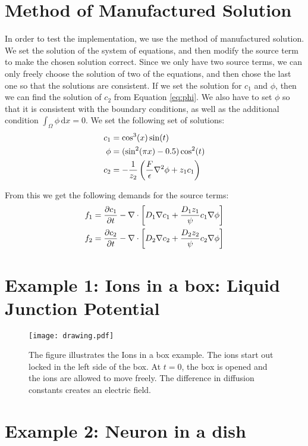 \documentclass[12pt]{article}
\begin{document}
\section{Method of Manufactured Solution}
In order to test the implementation, we use the method of manufactured solution. We set the solution of the system of equations, and then modify the source term to make the chosen solution correct. Since we only have two source terms, we can only freely choose the solution of two of the equations, and then chose the last one so that the solutions are consistent. If we set the solution for $c_1$ and $\phi$, then we can find the solution of $c_2$ from Equation \eqref{eq:phi}. We also have to set $\phi$ so that it is consistent with the boundary conditions, as well as the additional condition $\int_\Omega \phi\, \text{d}x = 0$. We set the following set of solutions:
\begin{align}
c_1 &= \cos^3(x) \sin(t) \\ 
\phi &= (\sin^2(\pi x) - 0.5)\cos^2(t) \\
c_2 & = -{1\over z_2} \left( {F \over \epsilon}\nabla^2\phi + z_1c_1\right)
\end{align}

From this we get the following demands for the source terms: 
\begin{align}
f_1 & = {\partial c_1 \over \partial t} - \nabla \cdot\left[ D_1 \nabla c_1 + {D_1z_1 \over \psi} c_1 \nabla \phi \right] \\ 
f_2 & = {\partial c_2 \over \partial t} - \nabla \cdot\left[ D_2 \nabla c_2 + {D_2z_2 \over \psi} c_2 \nabla \phi \right]
\end{align}

\section{Example 1: Ions in a box: Liquid Junction Potential}
\begin{figure}[h]
\centering
\texttt{[image: drawing.pdf]}
\label{fig:ljp}
\caption{The figure illustrates the Ions in a box example. The ions start out locked in the left side of the box. At $t=0$, the box is opened and the ions are allowed to move freely. The difference in diffusion constants creates an electric field.}
\end{figure}



\section{Example 2: Neuron in a dish}
\end{document}
